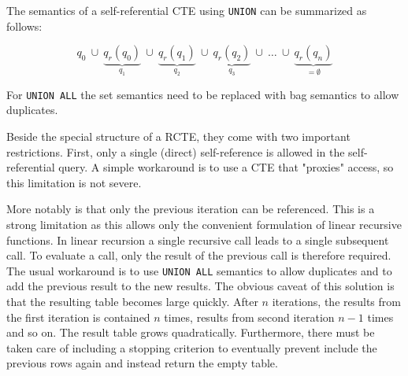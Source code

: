 The semantics of a self-referential CTE using \texttt{UNION} can be summarized as follows:

$$
q_0 ~\cup ~\underbrace{q_r(q_0)}_{q_1} ~\cup~ \underbrace{q_r(q_1)}_{q_2}~ \cup~\underbrace{q_r(q_2)}_{q_3}~ \cup ~\hdots ~ \cup ~ \underbrace{q_r(q_n)}_{= \emptyset}
$$

For \texttt{UNION ALL} the set semantics need to be replaced with bag semantics to allow duplicates.

Beside the special structure of a RCTE, they come with two important restrictions. First, only a single (direct) self-reference is allowed in the self-referential query. A simple workaround is to use a CTE that "proxies" access, so this limitation is not severe.

More notably is that only the previous iteration can be referenced. This is a strong limitation as this allows only the convenient formulation of linear recursive functions. In linear recursion a single recursive call leads to a single subsequent call. To evaluate a call, only the result of the previous call is therefore required. The usual workaround is to use \texttt{UNION ALL} semantics to allow duplicates and to add the previous result to the new results. The obvious caveat of this solution is that the resulting table becomes large quickly. After $n$ iterations, the results from the first iteration is contained $n$ times, results from second iteration $n-1$ times and so on. The result table grows quadratically. Furthermore, there must be taken care of including a stopping criterion to eventually prevent include the previous rows again and instead return the empty table.
